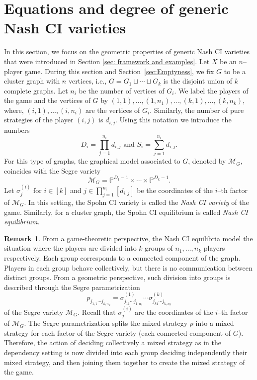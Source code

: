 \documentclass[11pt]{amsart}
\numberwithin{equation}{section}
\theoremstyle{plain}
\numberwithin{theorem}{section}
\theoremstyle{definition}
\newtheorem{remark}[theorem]{Remark}
\newcommand{\PP}{{\mathbb P}}
\newcommand{\Mg}{{\mathcal M}_G}
\begin{document}
\section{Equations and degree of generic Nash CI varieties}\label{sec:nash ci}


In this section, we focus on the geometric properties of generic Nash CI varieties that were introduced in Section \ref{sec: framework and examples}. Let $X$ be an $n$--player game. During this section and Section~\ref{sec:Emptyness}, we fix $G$ to be a cluster graph with $n$ vertices, i.e., $G=G_1\sqcup\cdots\sqcup G_k$ is the disjoint union of $k$ complete graphs. Let $n_i$ be the number of vertices of $G_i$. 
We label the players of the game and the vertices of $G$ by $(1,1),\ldots,(1,n_1),\ldots,(k,1),\ldots,(k,n_k)$, where, $(i,1),\ldots,(i,n_i)$ are the vertices of $G_i$. Similarly, the number of pure strategies of the player $(i,j)$ is $d_{i,j}$. Using this notation we introduce the numbers
\[
D_i = \prod_{j=1}^{n_i}d_{i,j} \text{ and } S_i=\sum_{j=1}^{n_i}d_{i,j}.
\]
For this type of graphs, the graphical model associated to $G$, denoted by $\Mg$, coincides with the Segre variety
\begin{equation}
    \label{eq:Nash and Segree}
    \Mg=\PP^{D_1-1}\times\cdots\times\PP^{D_k-1}.
\end{equation}
Let $\sigma^{(i)}_j$ for $i\in[k]$ and $j\in\prod_{j=1}^{n_i}[d_{i,j}]$ be the coordinates of the $i$--th factor of $ \Mg$.
In this setting, the Spohn CI variety is called the \emph{Nash CI variety} of the game. Similarly, for a cluster graph, the Spohn CI equilibrium is called \emph{Nash CI equilibrium}.


\begin{remark}
    From a game-theoretic perspective, the Nash CI equilibria model the situation where the players are divided into $k$ groups of $n_1,\ldots,n_k$ players respectively. Each group corresponds to a connected component of the graph. Players in each group behave collectively, but there is no communication between distinct groups. From a geometric perspective, such division into groups is described through the Segre parametrization 
    \[
    p_{j_{1,1}\cdots j_{k,n_k}}=\sigma^{(1)}_{j_{11}\cdots j_{1,n_1}}\cdots \sigma^{(k)}_{j_{k1}\cdots j_{k,n_k}}
    \]
    of the Segre variety $\mathcal{M}_G$. Recall that $\sigma^{(i)}_j$ are the coordinates of the $i$--th factor of $\mathcal{M}_G$. The Segre parametrization splits the mixed strategy $p$ into a mixed strategy for each factor of the Segre variety (each connected component of $G$). Therefore, the action of deciding collectively a mixed strategy as in the dependency setting is now divided into each group deciding independently their mixed strategy, and then joining them together to create the mixed strategy of the game.
\end{remark}
\end{document}

